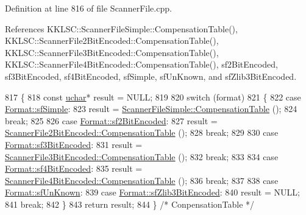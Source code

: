 Definition at line 816 of file Scanner\+File.\+cpp.



References K\+K\+L\+S\+C\+::\+Scanner\+File\+Simple\+::\+Compensation\+Table(), K\+K\+L\+S\+C\+::\+Scanner\+File2\+Bit\+Encoded\+::\+Compensation\+Table(), K\+K\+L\+S\+C\+::\+Scanner\+File3\+Bit\+Encoded\+::\+Compensation\+Table(), K\+K\+L\+S\+C\+::\+Scanner\+File4\+Bit\+Encoded\+::\+Compensation\+Table(), sf2\+Bit\+Encoded, sf3\+Bit\+Encoded, sf4\+Bit\+Encoded, sf\+Simple, sf\+Un\+Known, and sf\+Zlib3\+Bit\+Encoded.


\begin{DoxyCode}
817 \{
818   \textcolor{keyword}{const} \hyperlink{namespace_k_k_b_ace9969169bf514f9ee6185186949cdf7}{uchar}*  result = NULL;
819 
820   \textcolor{keywordflow}{switch}  (format)
821   \{
822   \textcolor{keywordflow}{case}  \hyperlink{class_k_k_l_s_c_1_1_scanner_file_a9eb976c9d084a94db71a5e8d1fadb903a7230911a32d0f83589b687452a05523f}{Format::sfSimple}:      
823     result = \hyperlink{class_k_k_l_s_c_1_1_scanner_file_simple_a0785f3ea487442d3c80d4ee70872b475}{ScannerFileSimple::CompensationTable} ();
824     \textcolor{keywordflow}{break};
825 
826   \textcolor{keywordflow}{case}  \hyperlink{class_k_k_l_s_c_1_1_scanner_file_a9eb976c9d084a94db71a5e8d1fadb903af3095a7a2ca6c23dfd11942c41a35d66}{Format::sf2BitEncoded}:
827     result = \hyperlink{class_k_k_l_s_c_1_1_scanner_file2_bit_encoded_a83ff6c2d28f8e6e8cdc673394f649805}{ScannerFile2BitEncoded::CompensationTable} ();
828     \textcolor{keywordflow}{break};
829 
830   \textcolor{keywordflow}{case}  \hyperlink{class_k_k_l_s_c_1_1_scanner_file_a9eb976c9d084a94db71a5e8d1fadb903a2a9330d778623273c413369a5f990849}{Format::sf3BitEncoded}:
831     result = \hyperlink{class_k_k_l_s_c_1_1_scanner_file3_bit_encoded_a912e45124ac943b21382c706bc4c3787}{ScannerFile3BitEncoded::CompensationTable} ();
832     \textcolor{keywordflow}{break};
833 
834   \textcolor{keywordflow}{case}  \hyperlink{class_k_k_l_s_c_1_1_scanner_file_a9eb976c9d084a94db71a5e8d1fadb903a624af7c88dcebdb27a791b18a6283325}{Format::sf4BitEncoded}:
835     result = \hyperlink{class_k_k_l_s_c_1_1_scanner_file4_bit_encoded_a9e4c61f8878da6a504ad21770a0190f8}{ScannerFile4BitEncoded::CompensationTable} ();
836     \textcolor{keywordflow}{break};
837 
838   \textcolor{keywordflow}{case}  \hyperlink{class_k_k_l_s_c_1_1_scanner_file_a9eb976c9d084a94db71a5e8d1fadb903a46f124cef43c06139c2ae4bf3f9564d0}{Format::sfUnKnown}:
839   \textcolor{keywordflow}{case}  \hyperlink{class_k_k_l_s_c_1_1_scanner_file_a9eb976c9d084a94db71a5e8d1fadb903a560710b758d0e94469989a47d8891e5d}{Format::sfZlib3BitEncoded}:
840     result = NULL;
841     \textcolor{keywordflow}{break};
842   \}
843   \textcolor{keywordflow}{return}  result;
844 \}  \textcolor{comment}{/* ConpensationTable */}
\end{DoxyCode}
